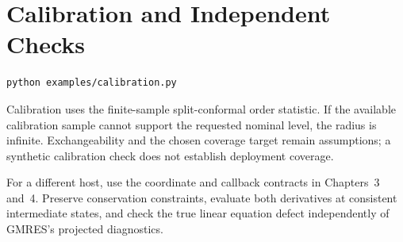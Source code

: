 \section{Calibration and Independent Checks}
\begin{lstlisting}[language=bash]
python examples/calibration.py
\end{lstlisting}
Calibration uses the finite-sample split-conformal order statistic. If
the available calibration sample cannot support the requested nominal
level, the radius is infinite. Exchangeability and the chosen coverage
target remain assumptions; a synthetic calibration check does not
establish deployment coverage.

For a different host, use the coordinate and callback contracts in
Chapters~3 and~4. Preserve conservation constraints, evaluate both
derivatives at consistent intermediate states, and check the true
linear equation defect independently of GMRES's projected diagnostics.
